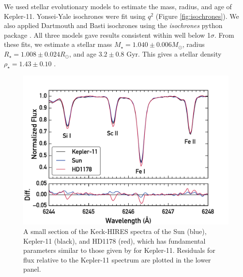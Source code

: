 \documentclass[oneside]{emulateapj}
\begin{document}
We used stellar evolutionary models to estimate the mass, radius, and age of Kepler-11. Yonsei-Yale isochrones were fit using $q^2$ (Figure \ref{fig:isochrones}). We also applied Dartmouth and Basti isochrones using the \textit{isochrones} python package \citep{Morton2015}. All three models gave results consistent within well below 1$\sigma$. From these fits, we estimate a stellar mass $M_{\star} = 1.040 \pm 0.006 M_{\odot}$, radius $R_{\star} = 1.008 \pm 0.024 R_{\odot}$, and age $3.2 \pm 0.8$ Gyr. This gives a stellar density $\rho_{\star} = 1.43 \pm 0.10$ \gcm.  %

\begin{figure}
\centering
\includegraphics[width=\columnwidth]{spec}
\caption{A small section of the Keck-HIRES spectra of the Sun (blue), Kepler-11 (black), and HD1178 (red), which has fundamental parameters similar to those given by \citet{Lissauer2013} for Kepler-11. Residuals for flux relative to the Kepler-11 spectrum are plotted in the lower panel.}
\label{fig:spec}
\end{figure}
\end{document}

